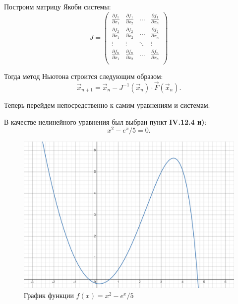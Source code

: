 		Построим матрицу Якоби системы:
		\begin{equation*}
			J = \begin{pmatrix}
				\displaystyle\frac{\partial f_1}{\partial x_1} & \displaystyle\frac{\partial f_1}{\partial x_2} & \ldots & \displaystyle\frac{\partial f_1}{\partial x_n} \\
				\displaystyle\frac{\partial f_2}{\partial x_1} & \displaystyle\frac{\partial f_2}{\partial x_2} & \ldots & \displaystyle\frac{\partial f_2}{\partial x_n} \\
				\vdots & \vdots & \ddots & \vdots \\
				\displaystyle\frac{\partial f_n}{\partial x_1} & \displaystyle\frac{\partial f_n}{\partial x_2} & \ldots & \displaystyle\frac{\partial f_n}{\partial x_n} \\
			\end{pmatrix}
		\end{equation*}
	
		Тогда метод Ньютона строится следующим образом:
		\begin{equation*}
			\vec{x}_{n+1} = \vec{x}_n - J^{-1}(\vec{x}_n) \cdot \vec{F}(\vec{x}_n).
		\end{equation*}
	
		Теперь перейдем непосредственно к самим уравнениям и системам.
		
		
		В качестве нелинейного уравнения был выбран пункт \textbf{IV.12.4 и)}:
		\begin{equation*}
			x^2 - e^x / 5 = 0.
		\end{equation*}
		
		
		\begin{figure}[h!]
			\centering
			\includegraphics[width=\linewidth]{Pictures/x2_ex_5}
			\caption{График функции $f(x) = x^2 - e^x / 5$}
			\label{x2}
		\end{figure}
		
